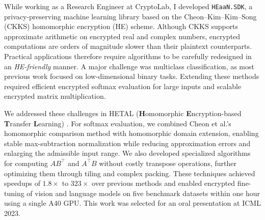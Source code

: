 \documentclass[letterpaper, 10pt]{article}
\begin{document}
While working as a Research Engineer at CryptoLab, I developed \texttt{HEaaN.SDK}, a privacy-preserving machine learning library based on the Cheon--Kim--Kim--Song (CKKS) homomorphic encryption (HE) scheme. Although CKKS supports approximate arithmetic on encrypted real and complex numbers, encrypted computations are orders of magnitude slower than their plaintext counterparts. Practical applications therefore require algorithms to be carefully redesigned in an \emph{HE-friendly} manner. A major challenge was multiclass classification, as most previous work focused on low-dimensional binary tasks. Extending these methods required efficient encrypted softmax evaluation for large inputs and scalable encrypted matrix multiplication.

We addressed these challenges in HETAL (\textbf{H}omomorphic \textbf{E}ncryption-based \textbf{T}ransfer \textbf{L}earning) \cite{lee2023hetal}. For softmax evaluation, we combined Cheon et al.'s homomorphic comparison method with homomorphic domain extension, enabling stable max-subtraction normalization while reducing approximation errors and enlarging the admissible input range. We also developed specialized algorithms for computing $AB^\intercal$ and $A^\intercal B$ without costly transpose operations, further optimizing them through tiling and complex packing. These techniques achieved speedups of $1.8\times$ to $323\times$ over previous methods and enabled encrypted fine-tuning of vision and language models on five benchmark datasets within one hour using a single A40 GPU. This work was selected for an oral presentation at ICML 2023.




{
\scriptsize
}
\end{document}
